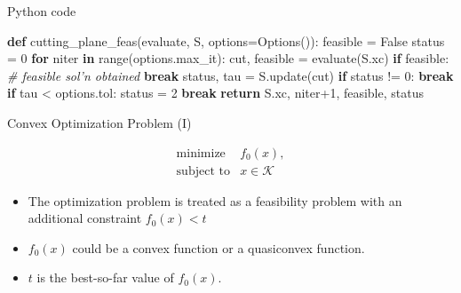 \documentclass[10pt,ignorenonframetext,serif,onlymath]{beamer}
\newenvironment{Shaded}{}{}
\newcommand{\BuiltInTok}[1]{#1}
\newcommand{\CommentTok}[1]{\textcolor[rgb]{0.38,0.63,0.69}{\textit{#1}}}
\newcommand{\ControlFlowTok}[1]{\textcolor[rgb]{0.00,0.44,0.13}{\textbf{#1}}}
\newcommand{\DecValTok}[1]{\textcolor[rgb]{0.25,0.63,0.44}{#1}}
\newcommand{\KeywordTok}[1]{\textcolor[rgb]{0.00,0.44,0.13}{\textbf{#1}}}
\newcommand{\NormalTok}[1]{#1}
\newcommand{\OperatorTok}[1]{\textcolor[rgb]{0.40,0.40,0.40}{#1}}
\newcommand{\VariableTok}[1]{\textcolor[rgb]{0.10,0.09,0.49}{#1}}
\begin{document}
\begin{frame}[fragile]{Python code}
\protect\hypertarget{sec:python-code}{}

\begin{Shaded}
\begin{Highlighting}[]
\KeywordTok{def}\NormalTok{ cutting_plane_feas(evaluate, S, options}\OperatorTok{=}\NormalTok{Options()):}
\NormalTok{    feasible }\OperatorTok{=} \VariableTok{False}
\NormalTok{    status }\OperatorTok{=} \DecValTok{0}
    \ControlFlowTok{for}\NormalTok{ niter }\KeywordTok{in} \BuiltInTok{range}\NormalTok{(options.max_it):}
\NormalTok{        cut, feasible }\OperatorTok{=}\NormalTok{ evaluate(S.xc)}
        \ControlFlowTok{if}\NormalTok{ feasible:  }\CommentTok{# feasible sol'n obtained}
            \ControlFlowTok{break}
\NormalTok{        status, tau }\OperatorTok{=}\NormalTok{ S.update(cut)}
        \ControlFlowTok{if}\NormalTok{ status }\OperatorTok{!=} \DecValTok{0}\NormalTok{:}
            \ControlFlowTok{break}
        \ControlFlowTok{if}\NormalTok{ tau }\OperatorTok{<}\NormalTok{ options.tol:}
\NormalTok{            status }\OperatorTok{=} \DecValTok{2}
            \ControlFlowTok{break}
    \ControlFlowTok{return}\NormalTok{ S.xc, niter}\OperatorTok{+}\DecValTok{1}\NormalTok{, feasible, status}
\end{Highlighting}
\end{Shaded}

\end{frame}

\begin{frame}{Convex Optimization Problem (I)}
\protect\hypertarget{sec:convex-optimization-problem-i}{}

\[\begin{array}{ll}
    \text{minimize}     & f_0(x), \\
    \text{subject to}   & x \in \mathcal{K}
\end{array}\]

\begin{itemize}
\item
  The optimization problem is treated as a feasibility problem with an
  additional constraint \(f_0(x) < t\)
\item
  \(f_0(x)\) could be a convex function or a quasiconvex function.
\item
  \(t\) is the best-so-far value of \(f_0(x)\).
\end{itemize}

\end{frame}
\end{document}
